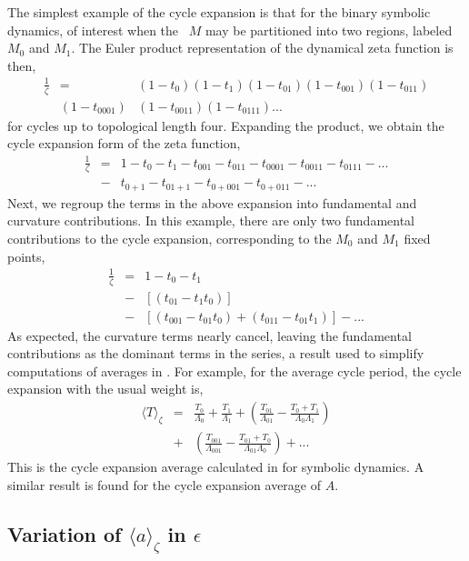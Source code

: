 \documentclass[aps,pre,
                showpacs,
                twocolumn,
                groupedaddress,
                floatfix]{revtex4-1}
\begin{document}
The simplest example of the cycle expansion is that for the binary
symbolic dynamics, of interest when the \statesp\ $M$ may be partitioned
into two regions, labeled $M_{0}$ and $M_{1}$. The Euler product
representation of the dynamical zeta function is then,
\begin{eqnarray*}
\frac{1}{\zeta} &=& (1 - t_{0})(1-t_{1})(1-t_{01})(1-t_{001})(1-t_{011})
\\ &(1-t_{0001})&(1-t_{0011})(1-t_{0111})...
\end{eqnarray*}
for cycles up to topological length four. Expanding the product, we
obtain the cycle expansion form of the zeta function,
\begin{eqnarray*}
\frac{1}{\zeta} &=& 1 - t_{0} - t_{1} - t_{001} - t_{011} - t_{0001} - t_{0011} - t_{0111} - ...
\\ &-& t_{0+1} - t_{01+1} - t_{0+001} - t_{0+011} - ...
\end{eqnarray*}
Next, we regroup the terms in the above expansion into fundamental and
curvature contributions. In this example, there are only two fundamental
contributions to the cycle expansion, corresponding to the $M_{0}$ and
$M_{1}$ fixed points,
\begin{eqnarray*}
\frac{1}{\zeta} &=& 1 - t_{0} - t_{1} \\ &-& [(t_{01} - t_{1}t_{0})] \\ &-& [(t_{001} - t_{01}t_{0}) + (t_{011} - t_{01}t_{1})] - ...
\end{eqnarray*}
As expected, the curvature terms nearly cancel, leaving the fundamental
contributions as the dominant terms in the series, a result used to
simplify computations of averages in . For example,
for the average cycle period, the cycle expansion with the usual weight
is,
\begin{eqnarray*}
\langle T \rangle_{\zeta} &=& \frac{T_{0}}{\Lambda_{0}} + \frac{T_{1}}{\Lambda_{1}} + \left( \frac{T_{01}}{\Lambda_{01}}-\frac{T_{0} + T_{1}}{\Lambda_{0}\Lambda_{1}}\right)
\\ &+& \left( \frac{T_{001}}{\Lambda_{001}}-\frac{T_{01} + T_{0}}{\Lambda_{01}\Lambda_{0}}\right) +...
\end{eqnarray*}
This is the cycle expansion average calculated in 
for symbolic dynamics. A similar result is found for the cycle expansion
average of $A$.

\subsection{Variation of $\langle a \rangle_{\zeta}$ in $\epsilon$}
\label{sect:VarObsEps}
\end{document}
